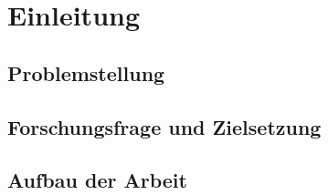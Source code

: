 \chapter{Einleitung}\label{chap:einleitung}

\section{Problemstellung}\label{sec:problem}

\section{Forschungsfrage und Zielsetzung}\label{sec:ziel}

\section{Aufbau der Arbeit}\label{sec:aufbau}
